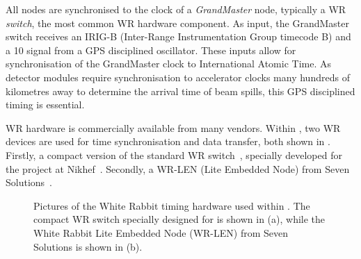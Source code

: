 All nodes are synchronised to the clock of a \emph{GrandMaster} node, typically a WR
\emph{switch}, the most common WR hardware component. As input, the GrandMaster switch receives an
IRIG-B (Inter-Range Instrumentation Group timecode B) and a \SI{10}{} signal from a GPS
disciplined oscillator. These inputs allow for synchronisation of the GrandMaster clock to
International Atomic Time. As \chips detector modules require synchronisation to accelerator
clocks many hundreds of kilometres away to determine the arrival time of beam spills, this GPS
disciplined timing is essential.

WR hardware is commercially available from many vendors. Within \chipsfive, two WR devices are
used for time synchronisation and data transfer, both shown in .
Firstly, a compact version of the standard WR switch~\cite{wrswitch2020}, specially developed for
the \chips project at Nikhef~\cite{wrchromium2020}. Secondly, a WR-LEN (Lite Embedded Node) from
Seven Solutions~\cite{wrlen2020}. 

\begin{figure} %
    \centering
    \quad
    \caption[Pictures of the White Rabbit timing hardware used within \chipsfive]
    {Pictures of the White Rabbit timing hardware used within \chipsfive. The compact WR switch
        specially designed for \chips is shown in (a), while the White Rabbit Lite Embedded Node
        (WR-LEN) from Seven Solutions is shown in (b).}
    \label{fig:wr_electronics}
\end{figure}

